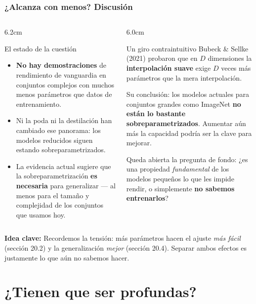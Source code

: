 \documentclass[aspectratio=169, 10pt]{beamer}
\newcommand{\idea}[1]{%
	\begin{tcolorbox}[colback=AccentGreen!6, colframe=AccentGreen, arc=3pt,
		width=\textwidth, boxsep=1pt, left=5pt, right=5pt, top=2pt, bottom=2pt,
		fontupper=\small]
		\RaggedRight\textbf{Idea clave:} #1
	\end{tcolorbox}
}
\begin{document}
\begin{frame}
\frametitle{¿Alcanza con menos? Discusión}
\footnotesize %
\begin{columns}[T]
\begin{column}{6.2cm}
\begin{alertblock}{El estado de la cuestión}
\begin{itemize}
	\item \textbf{No hay demostraciones} de rendimiento de vanguardia en conjuntos complejos con muchos menos par\'ametros que datos de entrenamiento.
	\item Ni la poda ni la destilaci\'on han cambiado ese panorama: los modelos reducidos siguen estando sobreparametrizados.
	\item La evidencia actual sugiere que la sobreparametrizaci\'on \textbf{es necesaria} para generalizar --- al menos para el tama\~no y complejidad de los conjuntos que usamos hoy.
\end{itemize}
\end{alertblock}
\end{column}
\begin{column}{6.0cm}
\begin{exampleblock}{Un giro contraintuitivo}
Bubeck \& Sellke (2021) probaron que en $D$ dimensiones la \textbf{interpolaci\'on suave} exige $D$ veces m\'as par\'ametros que la mera interpolaci\'on.
\vspace{0.3em}

Su conclusi\'on: los modelos actuales para conjuntos grandes como ImageNet \textbf{no est\'an lo bastante sobreparametrizados}. Aumentar a\'un m\'as la capacidad podr\'ia ser la clave para mejorar.
\end{exampleblock}
\vspace{0.3em}
\footnotesize
Queda abierta la pregunta de fondo: ¿es una propiedad \emph{fundamental} de los modelos peque\~nos lo que les impide rendir, o simplemente \textbf{no sabemos entrenarlos}?
\end{column}
\end{columns}
\vspace{0.2em}
\idea{Recordemos la tensi\'on: m\'as par\'ametros hacen el ajuste \emph{m\'as f\'acil} (secci\'on 20.2) y la generalizaci\'on \emph{mejor} (secci\'on 20.4). Separar ambos efectos es justamente lo que a\'un no sabemos hacer.}
\end{frame}

\section{¿Tienen que ser profundas?}
\end{document}
